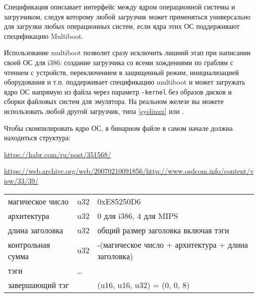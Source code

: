 \label{multiboot}

Спецификация  описывает интерфейс между ядром операционной
системы и загрузчиком, следуя которому любой загрузчик может применяться
универсально для загрузки любых операционных систем, если ядра этих ОС
поддерживают спецификацию Multiboot.

Использование multiboot позволит сразу исключить лишний этап при написании своей
ОС для i386: создание загрузчика со всеми хождениями по граблям с чтением с
устройств, переключением в защищенный режим, инициализацией оборудования и т.п.
 поддерживает спецификацию multiboot и может загружать ядро ОС
напрямую из файла через параметр \verb|-kernel| без образов дисков и сборки
файловых систем для эмулятора. На реальном железе вы можете использовать любой
другой загрузчик, типа  \ref{syslinux} или .

\clearpage
Чтобы скомпилировать ядро ОС, в бинарном файле в самом начале должна находиться
структура:
\bigskip

\noindent
\url{https://habr.com/ru/post/351568/}

\noindent
\url{https://web.archive.org/web/20070210091856/http://www.osdcom.info/content/view/33/39/}

\bigskip

\noindent
\begin{tabular}{l l l}
магическое число & u32 & 0xE85250D6 \\
архитектура	& u32 & 0 для i386, 4 для MIPS \\
длина заголовка & u32 & общий размер заголовка включая тэги \\
контрольная сумма & u32	& -(магическое число + архитектура + длина заголовка) \\
тэги & \ldots & \\
завершающий тэг & & (u16, u16, u32) = (0, 0, 8) \\
\end{tabular}

\clearpage
{}
